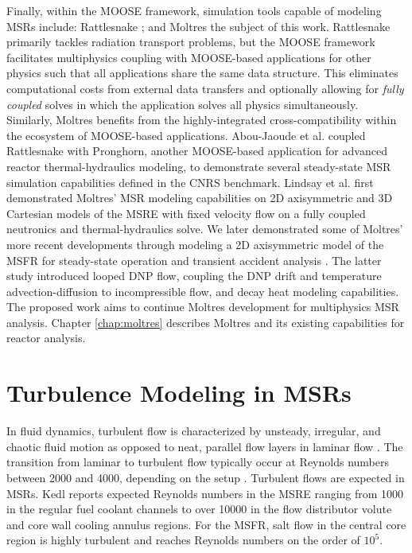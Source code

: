 Finally, within the MOOSE framework, simulation tools capable of modeling
\glspl{MSR} include: Rattlesnake \cite{wang_rattlesnake_2021}; and Moltres
\cite{lindsay_moltres_2017}\textemdash the subject of this work.
Rattlesnake primarily tackles radiation transport problems, but the MOOSE
framework facilitates multiphysics coupling
with MOOSE-based applications for other physics
such that all applications share the same data structure. This eliminates
computational costs from external data transfers and optionally allowing for
\textit{fully coupled} solves in which the application solves all physics
simultaneously. Similarly, Moltres benefits from the highly-integrated
cross-compatibility
within the ecosystem of MOOSE-based applications. Abou-Jaoude et al.
\cite{abou-jaoude_coupled_2020} coupled Rattlesnake with Pronghorn, another
MOOSE-based application for advanced reactor thermal-hydraulics modeling, to
demonstrate several steady-state \gls{MSR} simulation capabilities defined in
the CNRS benchmark. Lindsay et al.
\cite{lindsay_introduction_2018} first demonstrated Moltres' \gls{MSR} modeling
capabilities on 2D axisymmetric and 3D Cartesian models of the \gls{MSRE} with
fixed velocity flow on a fully coupled neutronics and thermal-hydraulics solve.
We later demonstrated some of Moltres' more recent developments through
modeling a 2D axisymmetric model of the \gls{MSFR} for steady-state operation
and transient accident analysis \cite{park_advancement_2020}. The latter study
introduced looped \gls{DNP} flow, coupling the \gls{DNP} drift and temperature 
advection-diffusion to incompressible flow, and decay heat modeling
capabilities. The proposed work aims to continue Moltres development for
multiphysics \gls{MSR} analysis. Chapter \ref{chap:moltres} describes Moltres
and its existing capabilities for reactor analysis.

\section{Turbulence Modeling in MSRs}

In fluid dynamics, turbulent flow is characterized by unsteady, irregular, and
chaotic fluid motion as opposed to neat, parallel flow layers in laminar flow
\cite{pope_turbulent_2000}. The transition from laminar to turbulent flow
typically occur at Reynolds numbers between 2000 and 4000, depending on the
setup \cite{pope_turbulent_2000}. Turbulent flows are expected in \glspl{MSR}.
Kedl \cite{kedl_fluid_1970} reports expected Reynolds numbers in the \gls{MSRE}
ranging from 1000 in the regular fuel coolant channels to over 10000 in the
flow distributor volute and core wall cooling annulus regions. For the
\gls{MSFR}, salt flow in the central core region is highly turbulent and
reaches Reynolds numbers on the order of $10^5$.

